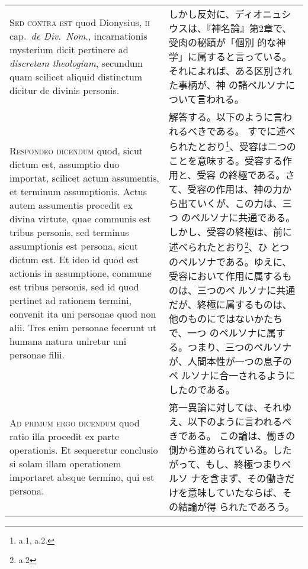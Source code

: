 \documentclass[10pt]{jsarticle} %
\begin{document}
\begin{longtable}{p{21em}p{21em}}
\\



{\scshape Sed contra est} quod Dionysius, {\scshape ii} cap.~{\itshape de Div.~Nom}., incarnationis
mysterium dicit pertinere ad {\itshape discretam theologiam}, secundum quam
scilicet aliquid distinctum dicitur de divinis personis.


&


しかし反対に、ディオニュシウスは、『神名論』第2章で、受肉の秘蹟が「個別
 的な神学」に属すると言っている。それによれば、ある区別された事柄が、神
 の諸ペルソナについて言われる。

\\



{\scshape Respondeo dicendum} quod, sicut dictum est, assumptio duo importat,
scilicet actum assumentis, et terminum assumptionis. Actus autem
assumentis procedit ex divina virtute, quae communis est tribus
personis, sed terminus assumptionis est persona, sicut dictum est. Et
ideo id quod est actionis in assumptione, commune est tribus personis,
sed id quod pertinet ad rationem termini, convenit ita uni personae quod
non alii. Tres enim personae fecerunt ut humana natura uniretur uni
personae filii.


&

解答する。以下のように言われるべきである。
すでに述べられたとおり\footnote{a.1, a.2.}、受容は二つのことを意味する。受容する作用と、受容
 の終極である。さて、受容の作用は、神の力から出ていくが、この力は、三つ
 のペルソナに共通である。しかし、受容の終極は、前に述べられたとおり\footnote{a.2}、ひ
 とつのペルソナである。ゆえに、受容において作用に属するものは、三つのペ
 ルソナに共通だが、終極に属するものは、他のものにではないかたちで、一つ
 のペルソナに属する。つまり、三つのペルソナが、人間本性が一つの息子のペ
 ルソナに合一されるようにしたのである。



\\



{\scshape Ad primum ergo dicendum} quod ratio illa procedit ex parte
operationis. Et sequeretur conclusio si solam illam operationem
importaret absque termino, qui est persona.


&


第一異論に対しては、それゆえ、以下のように言われるべきである。
この論は、働きの側から進められている。したがって、もし、終極つまりペルソ
 ナを含まず、その働きだけを意味していたならば、その結論が得
 られたであろう。



\end{longtable}
\end{document}
